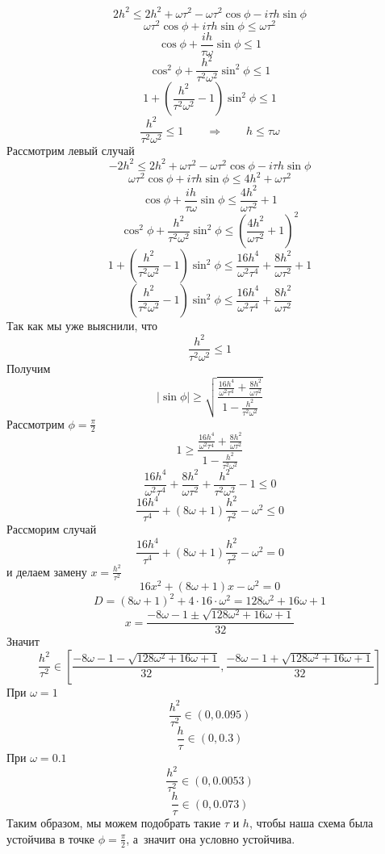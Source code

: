\begin{enumerate}
\[2h^2 \le 2h^2 + \omega \tau^2 - \omega \tau^2 
\cos\phi  -  i\tau h \sin\phi 
\]
\[
\omega \tau^2 
\cos\phi  +  i\tau h \sin\phi \le \omega \tau^2 
\]
\[
\cos\phi  +  \frac{i h}{\tau \omega} \sin\phi \le 1
\]
\[
\cos^2\phi  +  \frac{h^2}{\tau^2 \omega^2} \sin^2\phi \le 1
\]
\[
1  + \left(\frac{h^2}{\tau^2 \omega^2} - 1\right) \sin^2\phi \le 1
\]
\[
\frac{h^2}{\tau^2 \omega^2} \le 1  \qquad \Longrightarrow \qquad
h \le \tau \omega
\]
Рассмотрим левый случай
\[
-2h^2 \le 2h^2 + \omega \tau^2 - \omega \tau^2 
\cos\phi  -  i\tau h \sin\phi 
\]
\[
  \omega \tau^2 
\cos\phi  +  i\tau h \sin\phi \le 4h^2 + \omega \tau^2 
\]
\[
\cos\phi  +  \frac{i h}{\tau \omega}  \sin\phi \le \frac{4h^2}{\omega \tau^2 } + 1
\]
\[
\cos^2\phi  +  \frac{h^2}{\tau^2 \omega^2}  \sin^2\phi \le \left(\frac{4h^2}{\omega \tau^2 } + 1\right)^2
\]
\[
1  +  \left(\frac{h^2}{\tau^2 \omega^2} - 1\right)  \sin^2\phi \le \frac{16h^4}{\omega^2 \tau^4 } + \frac{8h^2}{\omega \tau^2 } + 1
\]
\[
\left(\frac{h^2}{\tau^2 \omega^2} - 1\right)  \sin^2\phi \le \frac{16h^4}{\omega^2 \tau^4 } + \frac{8h^2}{\omega \tau^2 } 
\]
Так как мы уже выяснили, что
\[
\frac{h^2}{\tau^2 \omega^2} \le 1
\]
Получим
\[
|\sin\phi| \ge \sqrt{\frac{\frac{16h^4}{\omega^2 \tau^4 } + \frac{8h^2}{\omega \tau^2}}{1 - \frac{h^2}{\tau^2 \omega^2}}}
\]
Рассмотрим $\phi = \frac{\pi}{2}$
\[
1 \ge \frac{\frac{16h^4}{\omega^2 \tau^4 } + \frac{8h^2}{\omega \tau^2}}{1 - \frac{h^2}{\tau^2 \omega^2}}
\]
\[
\frac{16h^4}{\omega^2 \tau^4 } + \frac{8h^2}{\omega \tau^2} +  \frac{h^2}{\tau^2 \omega^2} - 1 \le 0
\]
\[
\frac{16h^4}{ \tau^4 } + (8\omega + 1) \frac{h^2}{\tau^2 } - \omega^2 \le 0
\]
Рассморим случай 
\[
\frac{16h^4}{ \tau^4 } + (8\omega + 1) \frac{h^2}{\tau^2 } - \omega^2 = 0
\]
и делаем замену $x = \frac{h^2}{\tau^2 } $
\[
16x^2 + (8\omega + 1) x - \omega^2 = 0
\]
\[
D =  (8\omega + 1)^2 + 4 \cdot 16 \cdot \omega^2 = 128 \omega^2 + 16 \omega + 1
\]
\[
x = \frac{- 8 \omega - 1 \pm \sqrt{128 \omega^2 + 16 \omega + 1}}{32}
\]
Значит 
\[
\frac{h^2}{\tau^2} \in \left[ \frac{- 8 \omega - 1 - \sqrt{128 \omega^2 + 16 \omega + 1}}{32},  \frac{- 8 \omega - 1 + \sqrt{128 \omega^2 + 16 \omega + 1}}{32}  \right]
\]
При $\omega = 1$
\[
\frac{h^2}{\tau^2} \in \left( 0,  0.095 \right)
\]
\[
\frac{h}{\tau} \in \left( 0,  0.3 \right)
\]
При $\omega = 0.1$
\[
\frac{h^2}{\tau^2} \in \left( 0,  0.0053 \right)
\]
\[
\frac{h}{\tau} \in \left( 0,  0.073 \right)
\]
Таким образом, мы можем подобрать такие $\tau$ и $h$, чтобы наша схема была устойчива в точке $\phi = \frac{\pi}{2}$, а~значит она условно устойчива.
\end{enumerate}

